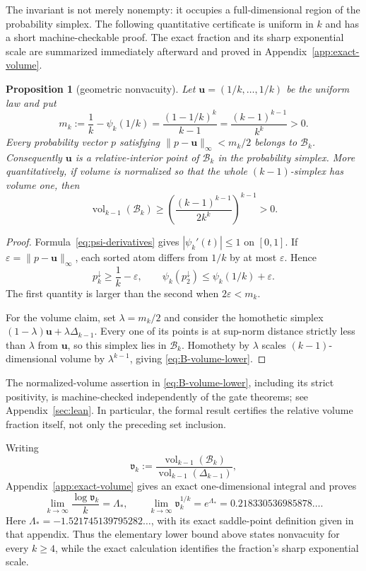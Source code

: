 \documentclass[11pt]{article}
\newtheorem{proposition}[theorem]{Proposition}
\theoremstyle{definition}
\theoremstyle{remark}
\newcommand{\body}{\mathcal{B}}
\newcommand{\down}{\downarrow}
\begin{document}
The invariant is not merely nonempty: it occupies a full-dimensional region
of the probability simplex.  The following quantitative certificate is
uniform in $k$ and has a short machine-checkable proof.
The exact fraction and its sharp exponential scale are summarized immediately
afterward and proved in Appendix~\ref{app:exact-volume}.

\begin{proposition}[geometric nonvacuity]\label{prop:B-interior}
Let $\mathbf u=(1/k,\ldots,1/k)$ be the uniform law and put
\[
 m_k:=\frac1k-\psi_k(1/k)
     =\frac{(1-1/k)^k}{k-1}
     =\frac{(k-1)^{k-1}}{k^k}>0.
\]
Every probability vector $p$ satisfying
$\lVert p-\mathbf u\rVert_\infty<m_k/2$ belongs to $\body_k$.
Consequently $\mathbf u$ is a relative-interior point of $\body_k$ in the probability simplex.  More
quantitatively, if volume is normalized so that the whole $(k-1)$-simplex
has volume one, then
\begin{equation}\label{eq:B-volume-lower}
 \operatorname{vol}_{k-1}(\body_k)
 \ge \left(\frac{(k-1)^{k-1}}{2k^k}\right)^{k-1}>0.
\end{equation}
\end{proposition}

\begin{proof}
Formula~\eqref{eq:psi-derivatives} gives
$|\psi_k'(t)|\le1$ on $[0,1]$.  If
$\varepsilon=\lVert p-\mathbf u\rVert_\infty$, each sorted atom differs from $1/k$
by at most $\varepsilon$.  Hence
\[
 p_k^\down\ge\frac1k-\varepsilon,
 \qquad
 \psi_k(p_2^\down)\le\psi_k(1/k)+\varepsilon.
\]
The first quantity is larger than the second when $2\varepsilon<m_k$.

For the volume claim, set $\lambda=m_k/2$ and consider the homothetic simplex
$(1-\lambda)\mathbf u+\lambda\Delta_{k-1}$.  Every one of its points is
at sup-norm distance strictly less than $\lambda$ from $\mathbf u$, so
this simplex lies in
$\body_k$.  Homothety by $\lambda$ scales $(k-1)$-dimensional volume by
$\lambda^{k-1}$, giving \eqref{eq:B-volume-lower}.
\end{proof}

The normalized-volume assertion in \eqref{eq:B-volume-lower}, including its
strict positivity, is machine-checked independently of the gate theorems; see
Appendix~\ref{sec:lean}.  In particular, the formal result certifies the
relative volume fraction itself, not only the preceding set inclusion.

Writing
\[
 \mathfrak v_k:=
 \frac{\operatorname{vol}_{k-1}(\body_k)}
      {\operatorname{vol}_{k-1}(\Delta_{k-1})},
\]
Appendix~\ref{app:exact-volume} gives an exact one-dimensional integral and
proves
\[
 \lim_{k\to\infty}\frac{\log\mathfrak v_k}{k}=\Lambda_*,
 \qquad
 \lim_{k\to\infty}\mathfrak v_k^{1/k}
 =e^{\Lambda_*}=0.218330536985878\ldots.
\]
Here $\Lambda_*=-1.521745139795282\ldots$, with its exact saddle-point
definition given in that appendix.  Thus the elementary lower bound above
states nonvacuity for every $k\ge4$, while the exact calculation identifies
the fraction's sharp exponential scale.
\end{document}
